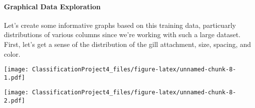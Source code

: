 \documentclass[
]{article}
\newenvironment{Shaded}{\begin{snugshade}}{\end{snugshade}}
\newcommand{\AttributeTok}[1]{\textcolor[rgb]{0.77,0.63,0.00}{#1}}
\newcommand{\ConstantTok}[1]{\textcolor[rgb]{0.00,0.00,0.00}{#1}}
\newcommand{\FunctionTok}[1]{\textcolor[rgb]{0.00,0.00,0.00}{#1}}
\newcommand{\NormalTok}[1]{#1}
\newcommand{\SpecialCharTok}[1]{\textcolor[rgb]{0.00,0.00,0.00}{#1}}
\newcommand{\StringTok}[1]{\textcolor[rgb]{0.31,0.60,0.02}{#1}}
\begin{document}
\hypertarget{graphical-data-exploration}{%
\paragraph{Graphical Data
Exploration}\label{graphical-data-exploration}}

Let's create some informative graphs based on this training data,
particuarly distributions of various columns since we're working with
such a large dataset. First, let's get a sense of the distribution of
the gill attachment, size, spacing, and color.

\begin{Shaded}
\end{Shaded}

\texttt{[image: ClassificationProject4\_files/figure-latex/unnamed-chunk-8-1.pdf]}

\begin{Shaded}
\end{Shaded}

\texttt{[image: ClassificationProject4\_files/figure-latex/unnamed-chunk-8-2.pdf]}

\begin{Shaded}
\end{Shaded}
\end{document}
